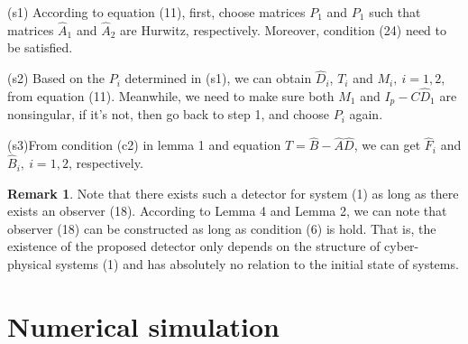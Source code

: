 \documentclass[english]{cccconf}
\theoremstyle{definition}
\newtheorem{remark}{Remark}
\begin{document}
(s1) According to equation (11), first, choose matrices $P_1$ and $P_1$ such that matrices $\hat{A}_1$ and  $\hat{A}_2$ are Hurwitz, respectively. Moreover, condition (24) need to be satisfied.

(s2) Based on the $P_i$ determined in (s1), we can obtain $\hat{D}_i$, $T_i$ and $M_i,\ i=1,2$, from equation (11). Meanwhile, we need to make sure both $M_1$ and $I_p-C\hat{D}_1$ are nonsingular, if it's not, then go back to step 1, and choose $P_i$ again.

(s3)From condition (c2) in lemma 1 and equation $T=\hat{B}-\hat{A}\hat{D}$, we can get $\hat{F}_i$ and $\hat{B}_i,\ i=1,2$, respectively.
\begin{remark}
Note that there exists such a detector for system (1) as long as there exists an observer (18). According to Lemma 4 and Lemma 2, we can note that observer (18) can be constructed as long as condition (6) is hold. That is, the existence of the proposed detector only depends on the structure of cyber-physical systems (1) and has absolutely no relation to the initial state of systems.
\end{remark}


\section{Numerical simulation}
\end{document}
